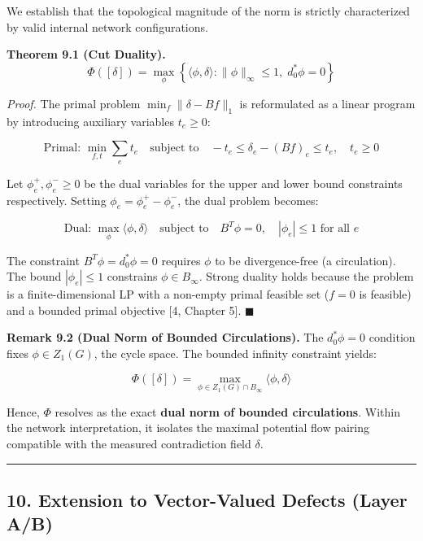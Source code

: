 \documentclass[
]{article}
\begin{document}
We establish that the topological magnitude of the norm is strictly
characterized by valid internal network configurations.

\textbf{Theorem 9.1 (Cut Duality).}
\[ \Phi([\delta]) = \max_{\phi} \left\{ \langle \phi, \delta \rangle : \|\phi\|_\infty \leq 1, \; d_0^* \phi = 0 \right\} \]

\emph{Proof.} The primal problem \(\min_{f} \|\delta - B f\|_1\) is
reformulated as a linear program by introducing auxiliary variables
\(t_e \geq 0\):

\[\text{Primal: } \min_{f, t} \sum_e t_e \quad \text{subject to} \quad -t_e \leq \delta_e - (Bf)_e \leq t_e, \quad t_e \geq 0\]

Let \(\phi^+_e, \phi^-_e \geq 0\) be the dual variables for the upper
and lower bound constraints respectively. Setting
\(\phi_e = \phi^+_e - \phi^-_e\), the dual problem becomes:

\[\text{Dual: } \max_{\phi} \langle \phi, \delta \rangle \quad \text{subject to} \quad B^T \phi = 0, \quad |\phi_e| \leq 1 \text{ for all } e\]

The constraint \(B^T \phi = d_0^* \phi = 0\) requires \(\phi\) to be
divergence-free (a circulation). The bound \(|\phi_e| \leq 1\)
constrains \(\phi \in B_\infty\). Strong duality holds because the
problem is a finite-dimensional LP with a non-empty primal feasible set
(\(f = 0\) is feasible) and a bounded primal objective {[}4, Chapter
5{]}. \(\blacksquare\)

\textbf{Remark 9.2 (Dual Norm of Bounded Circulations).} The
\(d_0^* \phi = 0\) condition fixes \(\phi \in Z_1(G)\), the cycle space.
The bounded infinity constraint yields:

\[ \Phi([\delta]) = \max_{\phi \in Z_1(G) \cap B_\infty} \langle \phi, \delta \rangle \]

Hence, \(\Phi\) resolves as the exact \textbf{dual norm of bounded
circulations}. Within the network interpretation, it isolates the
maximal potential flow pairing compatible with the measured
contradiction field \(\delta\).

\begin{center}\rule{0.5\linewidth}{0.5pt}\end{center}

\subsection{\texorpdfstring{10. Extension to Vector-Valued Defects
\textbf{(Layer
A/B)}}{10. Extension to Vector-Valued Defects (Layer A/B)}}\label{extension-to-vector-valued-defects-layer-ab}
\end{document}
